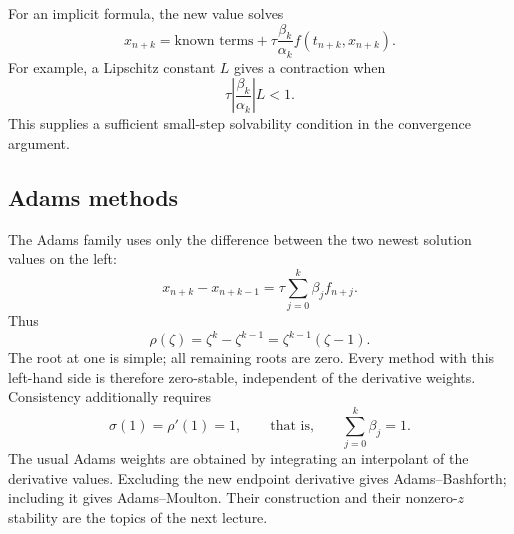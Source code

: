 For an implicit formula, the new value solves
\[
 x_{n+k}=\text{known terms}
              +\tau\frac{\beta_k}{\alpha_k}f(t_{n+k},x_{n+k}).
\]
For example, a Lipschitz constant \(L\) gives a contraction when
\[
 \tau\left|\frac{\beta_k}{\alpha_k}\right|L<1.
\]
This supplies a sufficient small-step solvability condition in the
convergence argument.

\subsection{Adams methods}

The Adams family uses only the difference between the two newest
solution values on the left:
\begin{equation}\label{eq:adams-form-oct-07}
 x_{n+k}-x_{n+k-1}
       =\tau\sum_{j=0}^k\beta_jf_{n+j}.
\end{equation}
Thus
\begin{equation}\label{eq:adams-rho-oct-07}
 \rho(\zeta)=\zeta^k-\zeta^{k-1}
            =\zeta^{k-1}(\zeta-1).
\end{equation}
The root at one is simple; all remaining roots are zero. Every
method with this left-hand side is therefore zero-stable, independent
of the derivative weights. Consistency additionally requires
\[
 \sigma(1)=\rho'(1)=1,
 \qquad\text{that is,}\qquad \sum_{j=0}^k\beta_j=1.
\]
The usual Adams weights are obtained by integrating an interpolant
of the derivative values. Excluding the new endpoint derivative
gives Adams--Bashforth; including it gives Adams--Moulton. Their
construction and their nonzero-\(z\) stability are the topics of
the next lecture.
